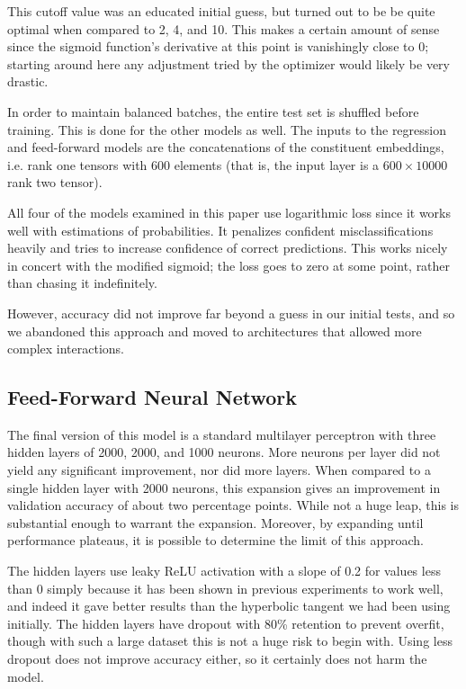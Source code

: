 \documentclass[a4paper, 12pt]{article}
\begin{document}
This cutoff value was an educated initial guess, but turned out to be be quite optimal when compared to 2, 4, and 10. This makes a certain amount of sense since the sigmoid function's derivative at this point is vanishingly close to 0; starting around here any adjustment tried by the optimizer would likely be very drastic.

In order to maintain balanced batches, the entire test set is shuffled before training. This is done for the other models as well. The inputs to the regression and feed-forward models are the concatenations of the constituent embeddings, i.e. rank one tensors with 600 elements (that is, the input layer is a $ 600 \times 10000 $ rank two tensor).

All four of the models examined in this paper use logarithmic loss since it works well with estimations of probabilities. It penalizes confident misclassifications heavily and tries to increase confidence of correct predictions. This works nicely in concert with the modified sigmoid; the loss goes to zero at some point, rather than chasing it indefinitely.

However, accuracy did not improve far beyond a guess in our initial tests, and so we abandoned this approach and moved to architectures that allowed more complex interactions.

\subsection{Feed-Forward Neural Network}
The final version of this model is a standard multilayer perceptron with three hidden layers of 2000, 2000, and 1000 neurons. More neurons per layer did not yield any significant improvement, nor did more layers. When compared to a single hidden layer with 2000 neurons, this expansion gives an improvement in validation accuracy of about two percentage points. While not a huge leap, this is substantial enough to warrant the expansion. Moreover, by expanding until performance plateaus, it is possible to determine the limit of this approach.

The hidden layers use leaky ReLU activation with a slope of 0.2 for values less than 0 simply because it has been shown in previous experiments to work well, and indeed it gave better results than the hyperbolic tangent we had been using initially. The hidden layers have dropout with 80\% retention to prevent overfit, though with such a large dataset this is not a huge risk to begin with. Using less dropout does not improve accuracy either, so it certainly does not harm the model.
\end{document}
